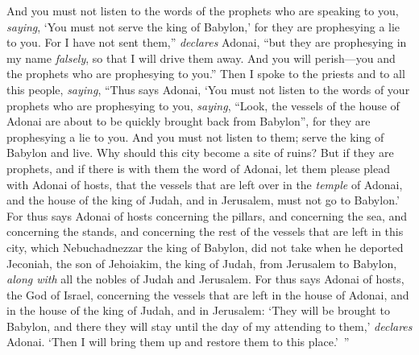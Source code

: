 \begin{biblechapter}
\verse And you must not listen to the words of the prophets who are speaking to you, \textit{saying}, ‘You must not serve the king of Babylon,’ for they are prophesying a lie to you.
\verse For I have not sent them,” \textit{declares} Adonai, “but they are prophesying in my name \textit{falsely}, so that I will drive them away. And you will perish—you and the prophets who are prophesying to you.”
 Then I spoke to the priests and to all this people, \textit{saying}, “Thus says Adonai, ‘You must not listen to the words of your prophets who are prophesying to you, \textit{saying}, “Look, the vessels of the house of Adonai are about to be quickly brought back from Babylon”, for they are prophesying a lie to you.
\verse And you must not listen to them; serve the king of Babylon and live. Why should this city become a site of ruins?
\verse But if they are prophets, and if there is with them the word of Adonai, let them please plead with Adonai of hosts, that the vessels that are left over in the \textit{temple} of Adonai, and the house of the king of Judah, and in Jerusalem, must not go to Babylon.’
\verse For thus says Adonai of hosts concerning the pillars, and concerning the sea, and concerning the stands, and concerning the rest of the vessels that are left in this city,
\verse which Nebuchadnezzar the king of Babylon, did not take when he deported Jeconiah, the son of Jehoiakim, the king of Judah, from Jerusalem to Babylon, \textit{along with} all the nobles of Judah and Jerusalem.
\verse For thus says Adonai of hosts, the God of Israel, concerning the vessels that are left in the house of Adonai, and in the house of the king of Judah, and in Jerusalem:
\verse ‘They will be brought to Babylon, and there they will stay until the day of my attending to them,’ \textit{declares} Adonai. ‘Then I will bring them up and restore them to this place.’ ”
\end{biblechapter}

